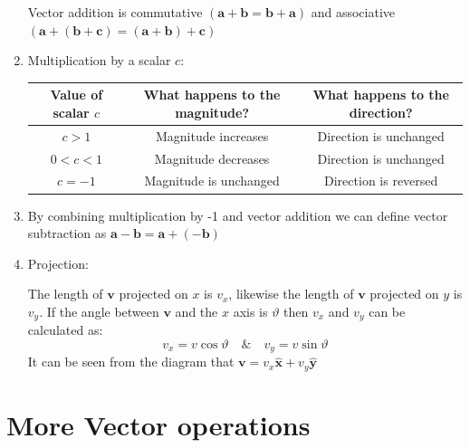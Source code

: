 \documentclass{article}
\renewcommand{\vec}[1]{\bm{#1}}
\begin{document}
\begin{enumerate}
\begin{center}
\end{center}
Vector addition is commutative \((\vec a + \vec b=\vec b + \vec a)\) and associative \((\vec a + (\vec b +\vec c)=(\vec a + \vec b) +\vec c)\)
\item Multiplication by a scalar \(c\):
\begin{center}
\begin{tabular}{|c|c|c|}\hline
Value of scalar \(c\) & What happens to the magnitude? & What happens to the direction?\\ \hline
\(c>1\) & Magnitude increases & Direction is unchanged\\ \hline
\(0<c<1\) & Magnitude decreases & Direction is unchanged\\ \hline
\(c=-1\) & Magnitude is unchanged & Direction is reversed\\ \hline
\end{tabular}
\end{center}
\item By combining multiplication by -1 and vector addition we can define vector subtraction as \(\vec a - \vec b = \vec a + (-\vec b)\)
\item Projection:
\begin{center}
\end{center}
The length of \(\vec v\) projected on \(x\) is \(v_x\), likewise the length of \(\vec v\) projected on \(y\) is \(v_y\). If the angle between \(\vec v\) and the \(x\) axis is \(\vartheta\) then \(v_x\) and \(v_y\) can be calculated as:
\[v_x=v\cos\vartheta \quad \text{\&} \quad v_y=v\sin\vartheta\]
It can be seen from the diagram that \(\vec v = v_x\vec{\hat{x}}+v_y\vec{\hat{y}}\)
\end{enumerate}

\section{More Vector operations}
\end{document}
